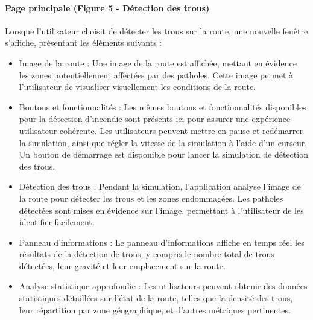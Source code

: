 \newpage
\paragraph{Page principale (Figure 5 - Détection des trous)}Lorsque l'utilisateur choisit de détecter les trous sur la route, une nouvelle fenêtre s'affiche, présentant les éléments suivants :
\begin{itemize}
    \item Image de la route :
Une image de la route est affichée, mettant en évidence les zones potentiellement affectées par des patholes. Cette image permet à l'utilisateur de visualiser visuellement les conditions de la route.
    \item Boutons et fonctionnalités :
Les mêmes boutons et fonctionnalités disponibles pour la détection d'incendie sont présents ici pour assurer une expérience utilisateur cohérente.
Les utilisateurs peuvent mettre en pause et redémarrer la simulation, ainsi que régler la vitesse de la simulation à l'aide d'un curseur.
Un bouton de démarrage est disponible pour lancer la simulation de détection des trous.
    \item Détection des trous :
Pendant la simulation, l'application analyse l'image de la route pour détecter les trous et les zones endommagées.
Les patholes détectées sont mises en évidence sur l'image, permettant à l'utilisateur de les identifier facilement.
\item Panneau d'informations :
Le panneau d'informations affiche en temps réel les résultats de la détection de trous, y compris le nombre total de trous détectées, leur gravité et leur emplacement sur la route.
\item Analyse statistique approfondie :
Les utilisateurs peuvent obtenir des données statistiques détaillées sur l'état de la route, telles que la densité des trous, leur répartition par zone géographique, et d'autres métriques pertinentes.

\end{itemize}
